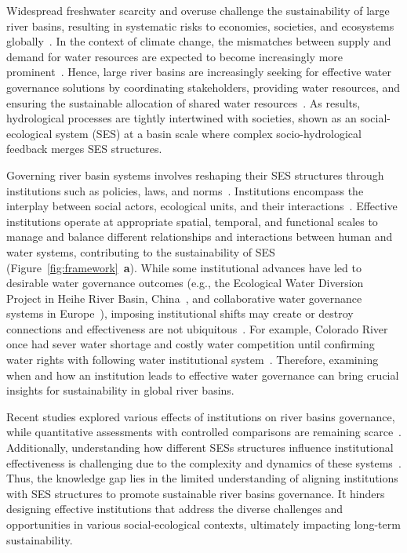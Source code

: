 Widespread freshwater scarcity and overuse challenge the sustainability of large river basins, resulting in systematic risks to economies, societies, and ecosystems globally~\cite{distefano2017, dolan2021, xu2020b, mekonnen2016}.
In the context of climate change, the mismatches between supply and demand for water resources are expected to become increasingly more prominent~\cite{florke2018, yoon2021}.
Hence, large river basins are increasingly seeking for effective water governance solutions by coordinating stakeholders, providing water resources, and ensuring the sustainable allocation of shared water resources~\cite{wang2019d}.
As results, hydrological processes are tightly intertwined with societies, shown as an social-ecological system (SES) at a basin scale where complex socio-hydrological feedback merges SES structures.

Governing river basin systems involves reshaping their SES structures through institutions such as policies, laws, and norms~\cite{young2008,cumming2020b}.
Institutions encompass the interplay between social actors, ecological units, and their interactions~\cite{lien2020, bodin2017b}.
Effective institutions operate at appropriate spatial, temporal, and functional scales to manage and balance different relationships and interactions between human and water systems, contributing to the sustainability of SES~\cite{epstein2015, wang2019d} (Figure~\ref{fig:framework}~\textbf{a}).
While some institutional advances have led to desirable water governance outcomes (e.g., the Ecological Water Diversion Project in Heihe River Basin, China~\cite{wang2019d}, and collaborative water governance systems in Europe~\cite{green2013}),
imposing institutional shifts may create or destroy connections and effectiveness are not ubiquitous~\cite{loos2022}. 
For example, Colorado River once had sever water shortage and costly water competition until confirming water rights with following water institutional system~\cite{hadjimichael2020}.  %
Therefore, examining when and how an institution leads to effective water governance can bring crucial insights for sustainability in global river basins.

Recent studies explored various effects of institutions on river basins governance, while quantitative assessments with controlled comparisons are remaining scarce~\cite{bouckaert2022, vallury2022, loch2020, kirchhoff2016}.
Additionally, understanding how different SESs structures influence institutional effectiveness is challenging due to the complexity and dynamics of these systems~\cite{bodin2017b}.
Thus, the knowledge gap lies in the limited understanding of aligning institutions with SES structures to promote sustainable river basins governance.
It hinders designing effective institutions that address the diverse challenges and opportunities in various social-ecological contexts, ultimately impacting long-term sustainability.

